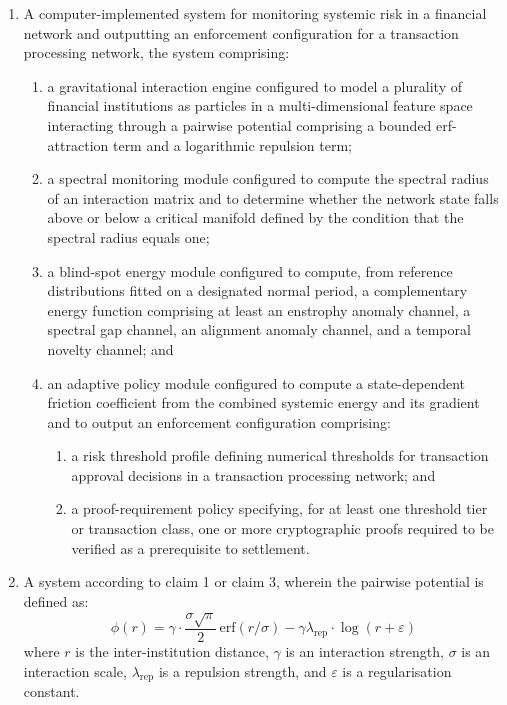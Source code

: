 \documentclass[12pt,a4paper]{article}
\begin{document}
\begin{enumerate}[label=\textbf{\arabic*.}]
\item A computer-implemented system for monitoring systemic risk in a
financial network and outputting an enforcement configuration for a
transaction processing network, the system comprising:
\begin{enumerate}[label=(\alph*)]
\item a gravitational interaction engine configured to model a plurality
of financial institutions as particles in a multi-dimensional feature
space interacting through a pairwise potential comprising a bounded
erf-attraction term and a logarithmic repulsion term;

\item a spectral monitoring module configured to compute the spectral radius
of an interaction matrix and to determine whether the network state falls
above or below a critical manifold defined by the condition that the spectral
radius equals one;

\item a blind-spot energy module configured to compute, from reference
distributions fitted on a designated normal period, a complementary energy
function comprising at least an enstrophy anomaly channel, a spectral gap
channel, an alignment anomaly channel, and a temporal novelty channel; and

\item an adaptive policy module configured to compute a state-dependent
friction coefficient from the combined systemic energy and its gradient and
to output an enforcement configuration comprising:
\begin{enumerate}[label=(\roman*)]
\item a risk threshold profile defining numerical thresholds for transaction
approval decisions in a transaction processing network; and
\item a proof-requirement policy specifying, for at least one threshold tier
or transaction class, one or more cryptographic proofs required to be
verified as a prerequisite to settlement.
\end{enumerate}
\end{enumerate}

\item A system according to claim 1 or claim 3, wherein the pairwise
potential is defined as:
\[
\phi(r) = \gamma\cdot\frac{\sigma\sqrt{\pi}}{2}\,\mathrm{erf}(r/\sigma)
- \gamma\lambda_{\mathrm{rep}}\cdot\log(r+\varepsilon)
\]
where $r$ is the inter-institution distance, $\gamma$ is an interaction
strength, $\sigma$ is an interaction scale, $\lambda_{\mathrm{rep}}$ is a
repulsion strength, and $\varepsilon$ is a regularisation constant.


\end{enumerate}
\end{document}
